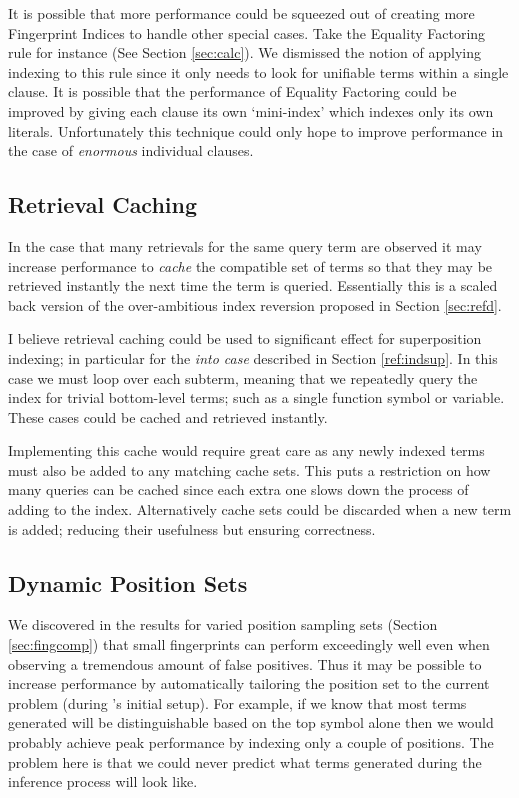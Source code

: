 It is possible that more performance could be squeezed out of creating more Fingerprint
Indices to handle other special cases. Take the Equality Factoring rule for instance
(See Section \ref{sec:calc}). We dismissed the notion of applying indexing to this rule
since it only needs to look for unifiable terms within a single clause. It is possible
that the performance of Equality Factoring could be improved by giving each clause
its own `mini-index' which indexes only its own literals. Unfortunately this technique
could only hope to improve performance in the case of \emph{enormous} individual clauses.

\subsection{Retrieval Caching}
In the case that many retrievals for the same query term are observed it may increase
performance to \emph{cache} the compatible set of terms so that they may be retrieved
instantly the next time the term is queried. Essentially this is a scaled back version
of the over-ambitious index reversion proposed in Section \ref{sec:refd}.

I believe retrieval caching could be used to significant effect for superposition
indexing; in particular for the \emph{into case} described in Section \ref{ref:indsup}.
In this case we must loop over each subterm, meaning that we repeatedly query the index
for trivial bottom-level terms; such as a single function symbol or variable. These cases
could be cached and retrieved instantly.

Implementing this cache would require great care as any newly indexed terms must
also be added to any matching cache sets. This puts a restriction on how many queries
can be cached since each extra one slows down the process of adding to the index.
Alternatively cache sets could be discarded when a new term is added; reducing their
usefulness but ensuring correctness.

\subsection{Dynamic Position Sets}
We discovered in the results for varied position sampling sets (Section \ref{sec:fingcomp}) that
small fingerprints can perform exceedingly well even when observing a tremendous
amount of false positives.
Thus it may be possible to increase performance by automatically tailoring the position
set to the current problem (during \beagle's initial setup). For example, if we know
that most terms generated will be distinguishable based on the top symbol alone
then we would probably achieve peak performance by indexing only a couple of positions.
The problem here is that we could never predict what terms generated during the inference process will look like.

